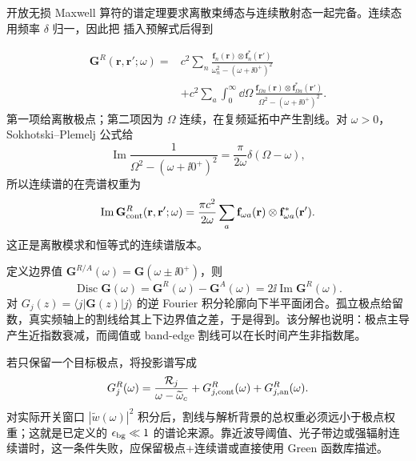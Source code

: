 \begin{derivation}
开放无损 Maxwell 算符的谱定理要求离散束缚态与连续散射态一起完备。连续态用频率 $\delta$ 归一，因此把 插入预解式后得到

\[
\begin{aligned}
\mathbf G^R(\mathbf r,\mathbf r';\omega)
={}&c^2\sum_n
\frac{\mathbf f_n(\mathbf r)\otimes\mathbf f_n^*(\mathbf r')}
{\omega_n^2-(\omega+\ii0^+)^2}\\
&+c^2\sum_a\int_0^\infty\dd\Omega\,
\frac{\mathbf f_{\Omega a}(\mathbf r)\otimes\mathbf f_{\Omega a}^*(\mathbf r')}
{\Omega^2-(\omega+\ii0^+)^2}.
\end{aligned}
\]
第一项给离散极点；第二项因为 $\Omega$ 连续，在复频延拓中产生割线。对 $\omega>0$，Sokhotski--Plemelj 公式给
\[
\operatorname{Im}\frac1{\Omega^2-(\omega+\ii0^+)^2}
=\frac{\pi}{2\omega}\delta(\Omega-\omega),
\]
所以连续谱的在壳谱权重为
\[
\operatorname{Im}\mathbf G_{\rm cont}^R(\mathbf r,\mathbf r';\omega)
=\frac{\pi c^2}{2\omega}
\sum_a\mathbf f_{\omega a}(\mathbf r)
\otimes\mathbf f_{\omega a}^*(\mathbf r').
\]
这正是离散模求和恒等式的连续谱版本。

定义边界值
$\mathbf G^{R/A}(\omega)=\mathbf G(\omega\pm\ii0^+)$，则
\[
\operatorname{Disc}\mathbf G(\omega)
=\mathbf G^R(\omega)-\mathbf G^A(\omega)
=2\ii\operatorname{Im}\mathbf G^R(\omega).
\]
对 $G_j(z)=\langle j|\mathbf G(z)|j\rangle$ 的逆 Fourier 积分轮廓向下半平面闭合。孤立极点给留数，真实频轴上的割线给其上下边界值之差，于是得到。该分解也说明：极点主导产生近指数衰减，而阈值或 band-edge 割线可以在长时间产生非指数尾。

若只保留一个目标极点，将投影谱写成
\[
G_j^R(\omega)
=\frac{\mathcal R_j}{\omega-\widetilde\omega_c}
+G_{j,\mathrm{cont}}^R(\omega)+G_{j,\rm an}^R(\omega).
\]
对实际开关窗口 $|\widetilde w(\omega)|^2$ 积分后，割线与解析背景的总权重必须远小于极点权重；这就是已定义的 $\epsilon_{\rm bg}\ll1$ 的谱论来源。靠近波导阈值、光子带边或强辐射连续谱时，这一条件失败，应保留极点+连续谱或直接使用 Green 函数库描述。
\end{derivation}

